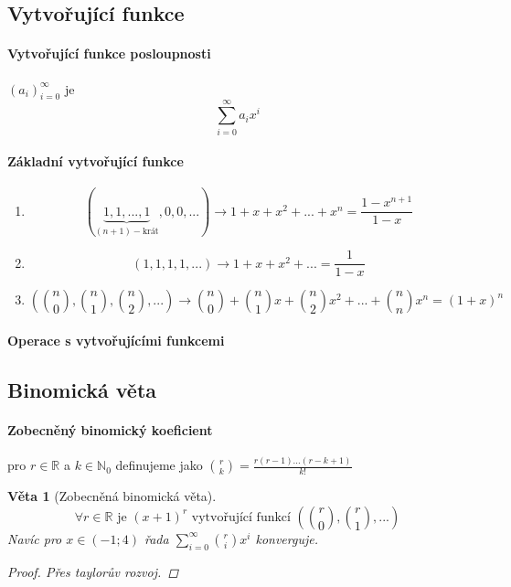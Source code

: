 \documentclass[10pt,a4paper]{article}
\theoremstyle{plain}
\newtheorem*{veta}{Věta}
\begin{document}
\subsection{Vytvořující funkce}

\paragraph{Vytvořující funkce posloupnosti} $(a_i)^\infty_{i=0}$ je \[ \sum_{i=0}^\infty a_i x^i \]
\paragraph{Základní vytvořující funkce}
\begin{enumerate}
\item \[(\underbrace{1,1,...,1}_{(n+1)-\text{krát}},0,0,...) \to 1 + x + x^2 + ... + x^n = \frac{1-x^{n+1}}{1-x} \]
\item \[(1,1,1,1,...) \to 1 + x + x^2 + ...  = \frac{1}{1-x} \]
\item \[\left(\binom{n}{0},\binom{n}{1},\binom{n}{2},... \right) \to \binom{n}{0} + \binom{n}{1}x + \binom{n}{2}x^2 + ... + \binom{n}{n}x^n  = (1+x)^n \]
\end{enumerate}


\paragraph{Operace s vytvořujícími funkcemi}

\subsection{Binomická věta}

\paragraph{Zobecněný binomický koeficient} pro $r \in \mathbb{R}$ a $k \in \mathbb{N}_0$ definujeme jako $\binom{r}{k} = \frac{r(r-1)...(r-k+1)}{k!}$

\begin{veta}[Zobecněná binomická věta]
	\[ \forall r \in \mathbb{R} \text{ je } (x+1)^r \text{ vytvořující funkcí } \left( \binom{r}0, \binom{r}1, ... \right)\]
	Navíc pro $x \in (-1;4)$ řada $\sum_{i=0}^\infty \binom{r}i x^i$ konverguje.
	\begin{proof}
		Přes taylorův rozvoj.
	\end{proof}
\end{veta}
\end{document}
